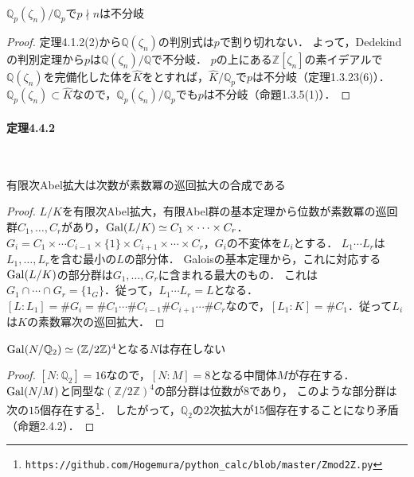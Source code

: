 \begin{screen}
  $\mathbb{Q}_p(\zeta_{n})/\mathbb{Q}_p$で$p\nmid n$は不分岐
\end{screen}
\begin{proof}
  定理4.1.2(2)から$\mathbb{Q}(\zeta_{n})$の判別式は$p$で割り切れない．
  よって，Dedekindの判別定理から$p$は$\mathbb{Q}(\zeta_{n})/\mathbb{Q}$で不分岐．
  $p$の上にある$\mathbb{Z}[\zeta_n]$の素イデアルで$\mathbb{Q}(\zeta_n)$を完備化した体を$\widehat{K}$をとすれば，$\widehat{K}/\mathbb{Q}_p$で$p$は不分岐（定理1.3.23(6)）．
  $\mathbb{Q}_p(\zeta_n)\subset\widehat{K}$なので，$\mathbb{Q}_p(\zeta_n)/\mathbb{Q}_p$でも$p$は不分岐（命題1.3.5(1)）．
\end{proof}

\paragraph{定理4.4.2}~
\begin{screen}
  有限次Abel拡大は次数が素数冪の巡回拡大の合成である
\end{screen}
\begin{proof}
  $L/K$を有限次Abel拡大，有限Abel群の基本定理から位数が素数冪の巡回群$C_1,\ldots,C_r$があり，$\operatorname{Gal}(L/K)\simeq C_1\times\cdots\times C_r$．
  $G_i=C_1\times\cdots C_{i-1}\times\{1\}\times C_{i+1}\times\cdots\times C_r$，$G_i$の不変体を$L_i$とする．
  $L_1\cdots L_r$は$L_1,\ldots,L_r$を含む最小の$L$の部分体．
  Galoisの基本定理から，これに対応する$\operatorname{Gal}(L/K)$の部分群は$G_1,\ldots,G_r$に含まれる最大のもの．
  これは$G_1\cap\cdots\cap G_r=\{1_G\}$．従って，$L_1\cdots L_r=L$となる．
  $[L:L_1]=\# G_i=\# C_1\cdots \#C_{i-1}\# C_{i+1}\cdots\# C_r$なので，$[L_1:K]=\# C_1$．従って$L_i$は$K$の素数冪次の巡回拡大．
\end{proof}

\begin{screen}
  $\operatorname{Gal}(N/\mathbb{Q}_2)\simeq(\mathbb{Z}/2\mathbb{Z})^4$となる$N$は存在しない
\end{screen}
\begin{proof}
  $[N:\mathbb{Q}_2]=16$なので，$[N:M]=8$となる中間体$M$が存在する．
  $\operatorname{Gal}(N/M)$と同型な$(\mathbb{Z}/2\mathbb{Z})^4$の部分群は位数が$8$であり，
  このような部分群は次の$15$個存在する\footnote{\verb|https://github.com/Hogemura/python_calc/blob/master/Zmod2Z.py|}．
  したがって，$\mathbb{Q}_2$の$2$次拡大が15個存在することになり矛盾（命題2.4.2）．
\end{proof}


